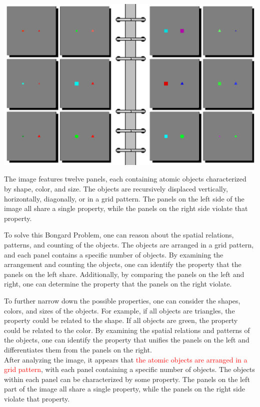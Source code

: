 \begin{tcolorbox}[breakable,enhanced jigsaw,opacityback=0,]
	\centering
	\includegraphics[width=.8\linewidth]{imgs/bongard/easy-9.png}\\
	\begin{dialogue}
		 The image features twelve panels, each containing atomic objects characterized by shape, color, and size. The objects are recursively displaced vertically, horizontally, diagonally, or in a grid pattern. The panels on the left side of the image all share a single property, while the panels on the right side violate that property.
		
		To solve this Bongard Problem, one can reason about the spatial relations, patterns, and counting of the objects. The objects are arranged in a grid pattern, and each panel contains a specific number of objects. By examining the arrangement and counting the objects, one can identify the property that the panels on the left share. Additionally, by comparing the panels on the left and right, one can determine the property that the panels on the right violate.
		
		To further narrow down the possible properties, one can consider the shapes, colors, and sizes of the objects. For example, if all objects are triangles, the property could be related to the shape. If all objects are green, the property could be related to the color. By examining the spatial relations and patterns of the objects, one can identify the property that unifies the panels on the left and differentiates them from the panels on the right.
		\\
		 After analyzing the image, it appears that \textcolor{red}{the atomic objects are arranged in a grid pattern}, with each panel containing a specific number of objects. The objects within each panel can be characterized by some property. The panels on the left part of the image all share a single property, while the panels on the right side violate that property.
		

\end{dialogue}
\end{tcolorbox}
